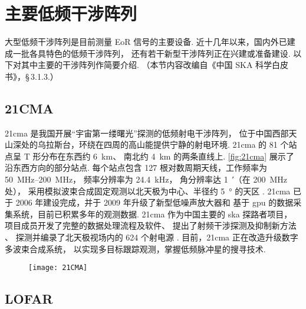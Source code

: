 \section{主要低频干涉阵列}
\label{sec:instruments}

大型低频干涉阵列是目前测量 EoR 信号的主要设备.
近十几年以来，国内外已建成一批各具特色的低频干涉阵列，
还有若干新型干涉阵列正在兴建或准备建设.
以下对其中主要的干涉阵列作简要介绍.
（本节内容改编自《中国 SKA 科学白皮书》，\S\,3.1.3.）

\subsection{21CMA}

\acf{21cma} 是我国开展“宇宙第一缕曙光”探测的低频射电干涉阵列，
位于中国西部天山深处的乌拉斯台，环绕在四周的高山能提供宁静的射电环境.
\acs{21cma} 的 81 个站点呈 T 形分布在东西约 \SI{6}{\km}、
南北约 \SI{4}{\km} 的两条直线上.
\autoref{fig:21cma} 展示了沿东西方向的部分站点.
每个站点包含 127 根对数周期天线，工作频率为 \SIrange{50}{200}{\MHz}，
频率分辨率为 \SI{24.4}{\kHz}，
角分辨率达 \SI{1}{\arcminute}（在 \SI{200}{\MHz} 处），
采用模拟波束合成固定观测以北天极为中心、半径约 \SI{5}{\degree} 的天区
\cite{wang2013,zheng2016}.
\acs{21cma} 已于 2006 年建设完成，并于 2009 年升级了新型低噪声放大器和
基于 \acs{gpu} 的数据采集系统，目前已积累多年的观测数据.
\acs{21cma} 作为中国主要的 \acs{ska} 探路者项目，
项目成员开发了完整的数据处理流程及软件、
提出了射频干涉探测及抑制新方法 \cite{huang2016}、
探测并编录了北天极视场内的 624 个射电源 \cite{zheng2016}.
目前，\acs{21cma} 正在改造升级数字多波束合成系统，
以实现多目标跟踪观测，掌握低频脉冲星的搜寻技术.

\begin{figure}[htp]
  \centering
  \texttt{[image: 21CMA]}
  \label{fig:21cma}
\end{figure}

\subsection{LOFAR}

